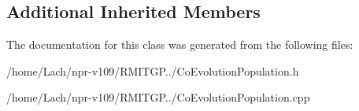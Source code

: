 \subsection*{Additional Inherited Members}


The documentation for this class was generated from the following files\+:\begin{DoxyCompactItemize}
\item 
/home/\+Lach/npr-\/v109/\+R\+M\+I\+T\+G\+P../Co\+Evolution\+Population.\+h\item 
/home/\+Lach/npr-\/v109/\+R\+M\+I\+T\+G\+P../Co\+Evolution\+Population.\+cpp\end{DoxyCompactItemize}
